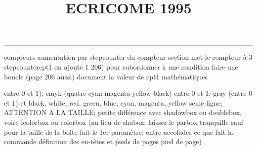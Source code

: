 \documentclass[11pt]{article}%
\title{\bf \vspace{-2cm} ECRICOME 1995} %
\author{} %
\date{} %
\renewcommand{\headrulewidth}{0pt}%
\renewcommand{\footrulewidth}{0.4pt}%
\begin{document}
\maketitle %
\vspace{-1.4cm}\hrule %
\thispagestyle{fancy}

\vspace*{.2cm}



compteurs%
aumentation par stepcounter du compteur section%
met le compteur à 3%
stepcounter{cpt1} on ajoute 1%
206) pour subordonner à une condition %
faire une boucle (page 206 aussi) %
document la valeur de cpt1 
mathématiques\newcommand{\ch}{\operatorname{ch}} 
\newcommand{\sh}{\operatorname{sh}}
\renewcommand{\tanh}{\operatorname{th}}
\renewcommand{\sinh}{\operatorname{sh}}
\renewcommand{\cosh}{\operatorname{ch}}
\newcommand{\argsh}{\operatorname{argsh}}
\newcommand{\argch}{\operatorname{argch}}
\newcommand{\argth}{\operatorname{argth}}
\newcommand{\Id}{\operatorname{Id}}
\renewcommand{\leq}{\leq}
\renewcommand{\geq}{\geq }

\newcommand{\dlim}{\lim}
\newcommand{\dsum}{\sum}
\newcommand{\dint}{\int}
\newcommand{\dprod}{\prod}



entre 0 et 1); cmyk (quatre cyan magenta yellow black) entre 0 et 1;
gray (entre 0 et 1) et black, white, red, green, blue, cyan, magenta,
yellow%
seule ligne; ATTENTION A LA TAILLE; petite différence avec shadowbox ou
doublebox, voire fcolorbox ou colorbox (au lieu de shabox; laisser le
parbox tranquille sauf pour la taille de la boîte
\newcommand{\Tbox}[1]{\begin{center} \shabox{\parbox{0.6
\linewidth}{#1}} \end{center}} %
fait le 1er paramètre; entre accolades ce que fait la commande
définition des en-têtes et pieds de pages\pagestyle{fancy}
\chead{}
\rfoot[ \ \thepage]{\thepage}
\cfoot{}
\lfoot{}
\thispagestyle{fancy} %
pied de page)\renewcommand{\footrulewidth}{0.4pt}
\renewcommand{\headrulewidth}{0.4pt}
\end{document}
